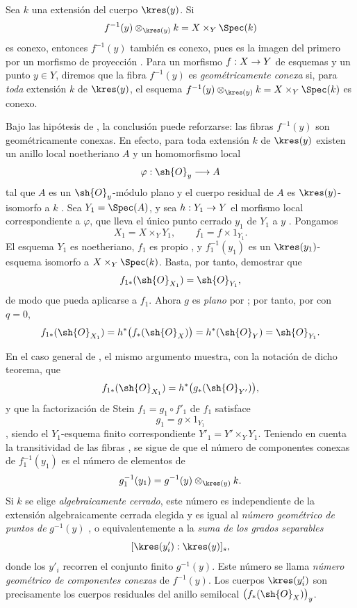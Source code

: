 \documentclass[oneside]{amsart}
\makeatletter
\newcommand{\ega@arrow}[2]{\mathchoice{#1}{#2}{#2}{#2}}
\renewcommand{\to}{\ega@arrow{\longrightarrow}{\rightarrow}}
\newcommand{\oldpage}[2][]{{\marginnote{\normalfont\textbf{#1}~|~#2}}\ignorespaces}
\let\EGAOriginalLabel\label
\renewcommand{\label}[1]{\phantomsection\EGAOriginalLabel{#1}}
\makeatother
\begin{document}
\begin{remark}[4.3.4]
\label{III.4.3.4}
Sea $k$ una extensión del cuerpo $\kres(y)$. Si
\[
  f^{-1}(y)\otimes_{\kres(y)}k
  =
  X\times_Y\Spec(k)
\]
es conexo, entonces $f^{-1}(y)$ también es conexo, pues es la imagen
del primero por un morfismo de proyección
. Para un morfismo $f:X\to Y$ de esquemas y un punto
$y\in Y$, diremos que la fibra $f^{-1}(y)$ es
\emph{geométricamente conexa} si, para \emph{toda} extensión $k$ de
$\kres(y)$, el esquema
$f^{-1}(y)\otimes_{\kres(y)}k=X\times_Y\Spec(k)$ es conexo.

\oldpage[III]{132}

Bajo las hipótesis de , la conclusión puede
reforzarse: las fibras $f^{-1}(y)$ son geométricamente conexas.
En efecto, para toda extensión $k$ de $\kres(y)$ existen un anillo
local noetheriano $A$ y un homomorfismo local
\[
  \varphi:\sh{O}_y\longrightarrow A
\]
tal que $A$ es un $\sh{O}_y$-módulo plano y el cuerpo residual de
$A$ es $\kres(y)$-isomorfo a $k$ .
Sea $Y_1=\Spec(A)$, y sea $h:Y_1\to Y$ el morfismo local
correspondiente a $\varphi$, que lleva el único punto cerrado $y_1$ de
$Y_1$ a $y$ . Pongamos
\[
  X_1=X\times_Y Y_1,
  \qquad
  f_1=f\times 1_{Y_1}.
\]
El esquema $Y_1$ es noetheriano, $f_1$ es propio
, y $f_1^{-1}(y_1)$ es un
$\kres(y_1)$-esquema isomorfo a $X\times_Y\Spec(k)$. Basta, por
tanto, demostrar que
\[
  f_{1*}(\sh{O}_{X_1})=\sh{O}_{Y_1},
\]
de modo que  pueda aplicarse a $f_1$. Ahora $g$ es
\emph{plano} por ; por tanto, por  con
$q=0$,
\[
  f_{1*}(\sh{O}_{X_1})
  =
  h^*\bigl(f_*(\sh{O}_X)\bigr)
  =
  h^*(\sh{O}_Y)
  =
  \sh{O}_{Y_1}.
\]

En el caso general de , el mismo argumento muestra,
con la notación de dicho teorema, que
\[
  f_{1*}(\sh{O}_{X_1})
  =
  h^*\bigl(g_*(\sh{O}_{Y'})\bigr),
\]
y que la factorización de Stein $f_1=g_1\circ f'_1$ de $f_1$
satisface
\[
  g_1=g\times 1_{Y_1}
\]
, siendo el $Y_1$-esquema finito correspondiente
$Y'_1=Y'\times_Y Y_1$. Teniendo en cuenta la transitividad de las
fibras , se sigue de
 que el número de componentes conexas de
$f_1^{-1}(y_1)$ es el número de elementos de
\[
  g_1^{-1}(y_1)
  =
  g^{-1}(y)\otimes_{\kres(y)}k.
\]
Si $k$ se elige \emph{algebraicamente cerrado}, este número es independiente
de la extensión algebraicamente cerrada elegida y es igual al
\emph{número geométrico de puntos de} $g^{-1}(y)$
, o equivalentemente a la \emph{suma de los grados separables}
\[
  [\kres(y'_i):\kres(y)]_s,
\]
donde los $y'_i$ recorren el conjunto finito $g^{-1}(y)$. Este número
se llama \emph{número geométrico de componentes conexas} de
$f^{-1}(y)$. Los cuerpos $\kres(y'_i)$ son precisamente los cuerpos
residuales del anillo semilocal $\bigl(f_*(\sh{O}_X)\bigr)_y$.
\end{remark}
\end{document}
